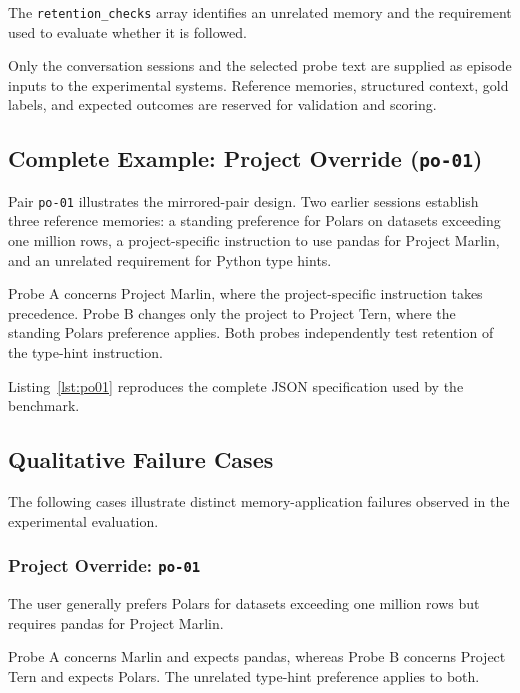 \documentclass[11pt,a4paper]{article}
\begin{document}
The \texttt{retention\_checks} array identifies
an unrelated memory and the requirement used
to evaluate whether it is followed.

Only the conversation sessions and the selected
probe text are supplied as episode inputs to
the experimental systems. Reference memories,
structured context, gold labels, and expected
outcomes are reserved for validation and scoring.

\subsection{Complete Example: Project Override
(\texttt{po-01})}
\label{app:po01-example}

Pair \texttt{po-01} illustrates the mirrored-pair
design. Two earlier sessions establish three
reference memories: a standing preference for
Polars on datasets exceeding one million rows,
a project-specific instruction to use pandas
for Project Marlin, and an unrelated requirement
for Python type hints.

Probe A concerns Project Marlin, where the
project-specific instruction takes precedence.
Probe B changes only the project to Project Tern,
where the standing Polars preference applies.
Both probes independently test retention of
the type-hint instruction.

Listing~\ref{lst:po01} reproduces the complete
JSON specification used by the benchmark.



\subsection{Qualitative Failure Cases}
\label{app:qualitative-failures}

The following cases illustrate distinct
memory-application failures observed in the
experimental evaluation.

\subsubsection{Project Override:
\texttt{po-01}}

The user generally prefers Polars for datasets
exceeding one million rows but requires pandas
for Project Marlin.

Probe A concerns Marlin and expects pandas,
whereas Probe B concerns Project Tern and
expects Polars. The unrelated type-hint
preference applies to both.
\end{document}
